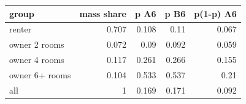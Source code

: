 \begin{tabular}{lrrrr}
\toprule
group & mass share & p A6 & p B6 & p(1-p) A6 \\
\midrule
renter & 0.707 & 0.108 & 0.11 & 0.067 \\
owner 2 rooms & 0.072 & 0.09 & 0.092 & 0.059 \\
owner 4 rooms & 0.117 & 0.261 & 0.266 & 0.155 \\
owner 6+ rooms & 0.104 & 0.533 & 0.537 & 0.21 \\
all & 1 & 0.169 & 0.171 & 0.092 \\
\bottomrule
\end{tabular}
